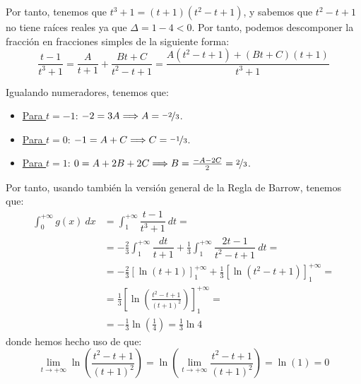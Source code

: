 \begin{ejercicio}
    Por tanto, tenemos que $t^3+1 = (t+1)(t^2-t+1)$, y sabemos que $t^2-t+1$ no tiene raíces reales ya que $\Delta = 1-4<0$.
    Por tanto, podemos descomponer la fracción en fracciones simples de la siguiente forma:
    \begin{equation*}
        \dfrac{t-1}{t^3+1} = \dfrac{A}{t+1} + \dfrac{Bt+C}{t^2-t+1} = \dfrac{A(t^2-t+1) + (Bt+C)(t+1)}{t^3+1}
    \end{equation*}

    Igualando numeradores, tenemos que:
    \begin{itemize}
        \item \ul{Para $t=-1$}: $-2 = 3A \Longrightarrow A=\nicefrac{-2}{3}$.
        \item \ul{Para $t=0$}: $-1 = A + C \Longrightarrow C=\nicefrac{-1}{3}$.
        \item \ul{Para $t=1$}: $0 = A + 2B + 2C \Longrightarrow B=\frac{-A-2C}{2}=\nicefrac{2}{3}$.
    \end{itemize}

    Por tanto, usando también la versión general de la Regla de Barrow, tenemos que:
    \begin{align*}
        \int_0^{+\infty} g(x)~dx &= \int_1^{+\infty} \dfrac{t-1}{t^3+1}~dt
        =\\&= -\frac{2}{3}\int_1^{+\infty} \dfrac{dt}{t+1} + \frac{1}{3}\int_1^{+\infty} \dfrac{2t-1}{t^2-t+1}~dt
        =\\&= -\frac{2}{3}\left[\ln(t+1)\right]_1^{+\infty} + \frac{1}{3}\left[\ln(t^2-t+1)\right]_1^{+\infty}
        =\\&= \frac{1}{3}\left[\ln\left(\frac{t^2-t+1}{(t+1)^2}\right)\right]_1^{+\infty}
        =\\&= -\frac{1}{3}\ln\left(\frac{1}{4}\right)
        = \frac{1}{3}\ln 4
    \end{align*}
    donde hemos hecho uso de que:
    \begin{equation*}
        \lim_{t\to+\infty}\ln\left(\frac{t^2-t+1}{(t+1)^2}\right) =
        \ln\left(\lim_{t\to+\infty}\frac{t^2-t+1}{(t+1)^2}\right) =
        \ln(1) = 0
    \end{equation*}
\end{ejercicio}


